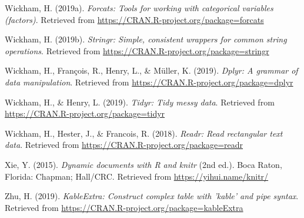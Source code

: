 \documentclass[man, fleqn, noextraspace,floatsintext]{apa6}
\begin{document}
\leavevmode\hypertarget{ref-R-forcats}{}%
Wickham, H. (2019a). \emph{Forcats: Tools for working with categorical variables (factors)}. Retrieved from \url{https://CRAN.R-project.org/package=forcats}

\leavevmode\hypertarget{ref-R-stringr}{}%
Wickham, H. (2019b). \emph{Stringr: Simple, consistent wrappers for common string operations}. Retrieved from \url{https://CRAN.R-project.org/package=stringr}

\leavevmode\hypertarget{ref-R-dplyr}{}%
Wickham, H., François, R., Henry, L., \& Müller, K. (2019). \emph{Dplyr: A grammar of data manipulation}. Retrieved from \url{https://CRAN.R-project.org/package=dplyr}

\leavevmode\hypertarget{ref-R-tidyr}{}%
Wickham, H., \& Henry, L. (2019). \emph{Tidyr: Tidy messy data}. Retrieved from \url{https://CRAN.R-project.org/package=tidyr}

\leavevmode\hypertarget{ref-R-readr}{}%
Wickham, H., Hester, J., \& Francois, R. (2018). \emph{Readr: Read rectangular text data}. Retrieved from \url{https://CRAN.R-project.org/package=readr}

\leavevmode\hypertarget{ref-R-knitr}{}%
Xie, Y. (2015). \emph{Dynamic documents with R and knitr} (2nd ed.). Boca Raton, Florida: Chapman; Hall/CRC. Retrieved from \url{https://yihui.name/knitr/}

\leavevmode\hypertarget{ref-R-kableExtra}{}%
Zhu, H. (2019). \emph{KableExtra: Construct complex table with 'kable' and pipe syntax}. Retrieved from \url{https://CRAN.R-project.org/package=kableExtra}

\endgroup
\end{document}
